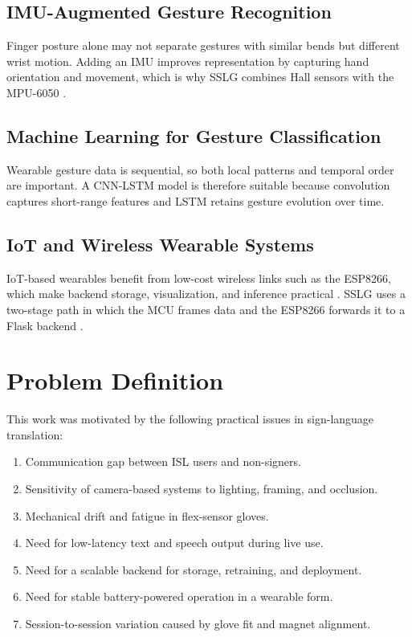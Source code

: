 \documentclass[12pt,a4paper]{report}
\begin{document}
\section{IMU-Augmented Gesture Recognition}
\label{sec:lit_imu}

Finger posture alone may not separate gestures with similar bends but different wrist motion. Adding an IMU improves representation by capturing hand orientation and movement, which is why SSLG combines Hall sensors with the MPU-6050 \cite{mpu6050}.

\section{Machine Learning for Gesture Classification}
\label{sec:lit_ml}

Wearable gesture data is sequential, so both local patterns and temporal order are important. A CNN-LSTM model is therefore suitable because convolution captures short-range features and LSTM retains gesture evolution over time.

\section{IoT and Wireless Wearable Systems}
\label{sec:lit_iot}

IoT-based wearables benefit from low-cost wireless links such as the ESP8266, which make backend storage, visualization, and inference practical \cite{esp8266}. SSLG uses a two-stage path in which the MCU frames data and the ESP8266 forwards it to a Flask backend \cite{flask}.


\chapter{Problem Definition}

This work was motivated by the following practical issues in sign-language translation:

\begin{enumerate}[label=\arabic*.]
  \item Communication gap between ISL users and non-signers.
  \item Sensitivity of camera-based systems to lighting, framing, and occlusion.
  \item Mechanical drift and fatigue in flex-sensor gloves.
  \item Need for low-latency text and speech output during live use.
  \item Need for a scalable backend for storage, retraining, and deployment.
  \item Need for stable battery-powered operation in a wearable form.
  \item Session-to-session variation caused by glove fit and magnet alignment.
\end{enumerate}
\end{document}
